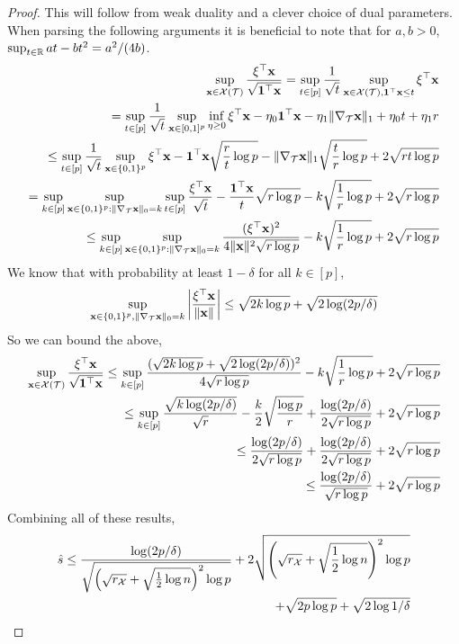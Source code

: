 \begin{proof}
This will follow from weak duality and a clever choice of dual parameters.
When parsing the following arguments it is beneficial to note that for $a,b > 0$, $\sup_{t \in \mathbb{R}} a t - b t^2 = a^2 / (4b)$.
\[
\begin{aligned}
\sup_{\mathbf{x} \in \mathcal{X}({\mathcal{T}})} \frac{\xi^\top \mathbf{x}}{\sqrt{{\bf 1}^\top \mathbf{x}}} = \sup_{t \in [p]} \frac 1{\sqrt{t}} \sup_{\mathbf{x} \in \mathcal{X}({\mathcal{T}}), {\bf 1}^\top \mathbf{x} \le t}  \xi^\top \mathbf{x}\\
= \sup_{t \in [p]} \frac 1{\sqrt{t}} \sup_{\mathbf{x} \in [0,1]^p} \inf_{\eta \ge 0} \xi^\top \mathbf{x} - \eta_0 {\bf 1}^\top \mathbf{x} - \eta_1 \|\nabla_{\mathcal{T}} \mathbf{x} \|_1 + \eta_0 t + \eta_1 r\\
\le \sup_{t \in [p]} \frac 1{\sqrt{t}} \sup_{\mathbf{x} \in \{0,1\}^p} \xi^\top \mathbf{x} - {\bf 1}^\top \mathbf{x} \sqrt{\frac{r}{t} \log p} - \|\nabla_{\mathcal{T}} \mathbf{x} \|_1 \sqrt{\frac{t}{r} \log p} + 2 \sqrt{rt \log p}\\
= \sup_{k \in [p]} \sup_{\mathbf{x} \in \{0,1\}^p : \| \nabla_{\mathcal{T}} \mathbf{x} \|_0 = k} \sup_{t \in [p]} \frac{\xi^\top \mathbf{x}}{\sqrt t} - \frac{{\bf 1}^\top \mathbf{x}}{t} \sqrt{r \log p} - k \sqrt{\frac{1}{r} \log p} + 2 \sqrt{r \log p}\\
\le \sup_{k \in [p]} \sup_{\mathbf{x} \in \{0,1\}^p : \| \nabla_{\mathcal{T}} \mathbf{x} \|_0 = k} \frac{(\xi^\top \mathbf{x})^2}{4 \| \mathbf{x} \|^2 \sqrt{r \log p}} - k \sqrt{\frac{1}{r} \log p} + 2 \sqrt{r \log p}\\
\end{aligned}
\]
We know that with probability at least $1 - \delta$ for all $k \in [p]$,
\[
\sup_{\mathbf{x} \in \{0,1\}^p, \|\nabla_{\mathcal{T}} \mathbf{x} \|_0 = k} \left| \frac{\xi^\top \mathbf{x}}{\| \mathbf{x} \|} \right| \le \sqrt{2 k \log p} + \sqrt{2 \log (2p / \delta)}
\]
So we can bound the above,
\[
\begin{aligned}
\sup_{\mathbf{x} \in \mathcal{X}({\mathcal{T}})}  \frac{\xi^\top \mathbf{x}}{\sqrt{{\bf 1}^\top \mathbf{x}}} \le \sup_{k \in [p]} \frac{(\sqrt{2 k \log p} + \sqrt{2 \log (2p / \delta)})^2}{4 \sqrt{r \log p}} - k \sqrt{\frac{1}{r} \log p} + 2 \sqrt{r \log p}\\
\le \sup_{k \in [p]} \frac{\sqrt{k \log (2p / \delta)}}{\sqrt{r}} - \frac{k}{2} \sqrt{\frac{\log p}{r}} + \frac{\log(2p / \delta)}{2\sqrt{r \log p}} + 2 \sqrt{r \log p}\\ 
\le \frac{\log (2p / \delta)}{2 \sqrt{r \log p} } + \frac{\log(2p / \delta)}{2\sqrt{r \log p}} + 2 \sqrt{r \log p}\\ 
\le \frac{\log (2p / \delta)}{\sqrt{r \log p} } + 2 \sqrt{r \log p}\\ 
\end{aligned}
\]
Combining all of these results,
\[
\begin{aligned}
\hat s \le \frac{\log (2p / \delta)}{\sqrt{ \left(\sqrt{r_{\mathcal{X}}} + \sqrt{\frac 12 \log n} \right)^2 \log p} } + 2 \sqrt{\left(\sqrt{r_{\mathcal{X}}} + \sqrt{\frac 12 \log n} \right)^2 \log p} \\
+ \sqrt{2 p \log p} + \sqrt{2 \log 1 / \delta}
\end{aligned}
\]

\end{proof}


